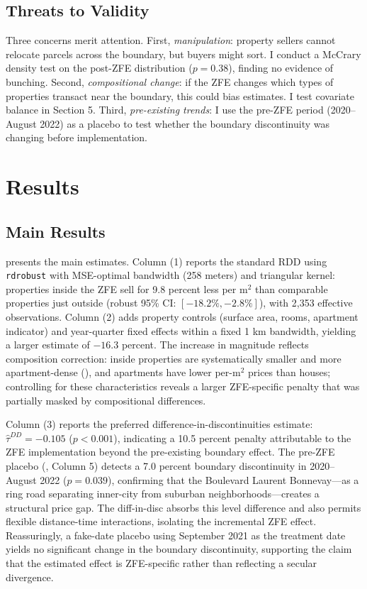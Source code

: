 \documentclass[12pt]{article}
\begin{document}
\subsection{Threats to Validity}

Three concerns merit attention. First, \textit{manipulation}: property sellers cannot relocate parcels across the boundary, but buyers might sort. I conduct a McCrary density test \citep{mccrary2008manipulation} on the post-ZFE distribution ($p = 0.38$), finding no evidence of bunching. Second, \textit{compositional change}: if the ZFE changes which types of properties transact near the boundary, this could bias estimates. I test covariate balance in Section 5. Third, \textit{pre-existing trends}: I use the pre-ZFE period (2020--August 2022) as a placebo to test whether the boundary discontinuity was changing before implementation.


\section{Results}

\subsection{Main Results}



 presents the main estimates. Column (1) reports the standard RDD using \texttt{rdrobust} with MSE-optimal bandwidth (258 meters) and triangular kernel: properties inside the ZFE sell for 9.8 percent less per m$^2$ than comparable properties just outside (robust 95\% CI: $[-18.2\%, -2.8\%]$), with 2,353 effective observations. Column (2) adds property controls (surface area, rooms, apartment indicator) and year-quarter fixed effects within a fixed 1 km bandwidth, yielding a larger estimate of $-16.3$ percent. The increase in magnitude reflects composition correction: inside properties are systematically smaller and more apartment-dense (), and apartments have lower per-m$^2$ prices than houses; controlling for these characteristics reveals a larger ZFE-specific penalty that was partially masked by compositional differences.

Column (3) reports the preferred difference-in-discontinuities estimate: $\hat\tau^{DD} = -0.105$ ($p < 0.001$), indicating a 10.5 percent penalty attributable to the ZFE implementation beyond the pre-existing boundary effect. The pre-ZFE placebo (, Column 5) detects a 7.0 percent boundary discontinuity in 2020--August 2022 ($p = 0.039$), confirming that the Boulevard Laurent Bonnevay---as a ring road separating inner-city from suburban neighborhoods---creates a structural price gap. The diff-in-disc absorbs this level difference and also permits flexible distance-time interactions, isolating the incremental ZFE effect. Reassuringly, a fake-date placebo using September 2021 as the treatment date yields no significant change in the boundary discontinuity, supporting the claim that the estimated effect is ZFE-specific rather than reflecting a secular divergence.
\end{document}

